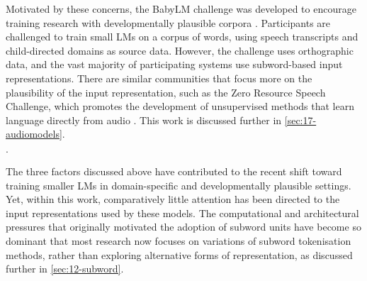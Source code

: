 
Motivated by these concerns, the BabyLM challenge was developed to encourage training research with developmentally plausible corpora \citep{warstadt-2023-babylm-findings, hu-etal-2024-findings}. Participants are challenged to train small LMs on a corpus of  words, using speech transcripts and child-directed domains as source data. However, the challenge uses orthographic data, and the vast majority of participating systems use subword-based input representations. There are similar communities that focus more on the plausibility of the input representation, such as the Zero Resource Speech Challenge, which promotes the development of unsupervised methods that learn language directly from audio \citep{dunbar_self-supervised_2022}. This work is discussed further in \cref{sec:17-audiomodels}.

\begin{center}
    {\LARGE $\cdot$}
\end{center}

The three factors discussed above have contributed to the recent shift toward training smaller LMs in domain-specific and developmentally plausible settings. Yet, within this work, comparatively little attention has been directed to the input representations used by these models. The computational and architectural pressures that originally motivated the adoption of subword units have become so dominant that most research now focuses on variations of subword tokenisation methods, rather than exploring alternative forms of representation, as discussed further in \cref{sec:12-subword}.

